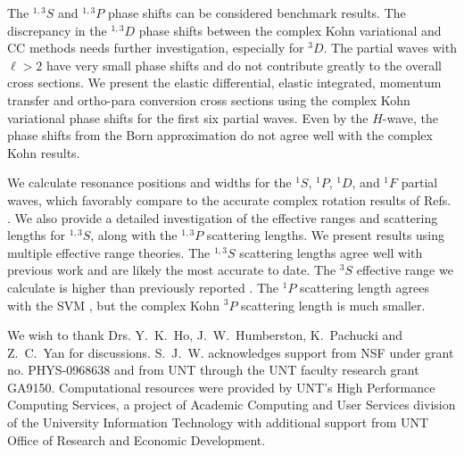 \documentclass[preprint,showpacs,showkeys,preprintnumbers,amsmath,amssymb,longbibliography,pra,aps]{revtex4-1}
\begin{document}
The $^{1,3}S$ and $^{1,3}P$ phase shifts can be considered benchmark results. The 
discrepancy in the $^{1,3}D$ phase shifts between the complex Kohn variational 
and CC methods needs further investigation, especially for $^3D$. The partial 
waves with $\ell > 2$ have very small phase shifts and do not contribute 
greatly to the overall cross sections. We present the elastic differential, elastic 
integrated, momentum transfer and ortho-para conversion cross sections using 
the complex Kohn variational phase shifts for
the first six partial waves. Even by the $H$-wave, the phase shifts from the Born
approximation do not agree well with the complex Kohn results.

We calculate resonance positions and widths for the $^1S$, $^1P$, $^1D$, and
$^1F$ partial waves, which favorably compare to the accurate complex 
rotation results of Refs. \cite{Yan1999,Yan1998a,Ho1998,Ho2000}. We also 
provide a detailed investigation of the effective ranges and scattering 
lengths for $^{1,3}S$, along with the $^{1,3}P$ scattering lengths. We 
present results using multiple effective range theories.
The $^{1,3}S$ scattering 
lengths agree well with previous work
\cite{VanReeth2003,Blackwood2002,Walters2004,Ivanov2002}
and are likely the most accurate to 
date. The $^3S$ effective range we calculate is higher than previously 
reported \cite{VanReeth2003,Blackwood2002,Ivanov2002}.
The $^1P$ scattering length agrees with the SVM \cite{Ivanov2002}, 
but the complex Kohn $^3P$ scattering length is much smaller.


\begin{acknowledgments}
We wish to thank Drs. Y.~K.~Ho, J.~W.~Humberston, K.~Pachucki and Z.~C.~Yan 
for discussions. S.~J.~W. acknowledges support from NSF under grant no.
PHYS-0968638 and from UNT through the UNT faculty research grant GA9150. 
Computational resources were provided by UNT's High Performance Computing 
Services, a project of Academic Computing and User Services division of the 
University Information Technology with additional support from UNT Office of 
Research and Economic Development.
\end{acknowledgments}



\end{document}

